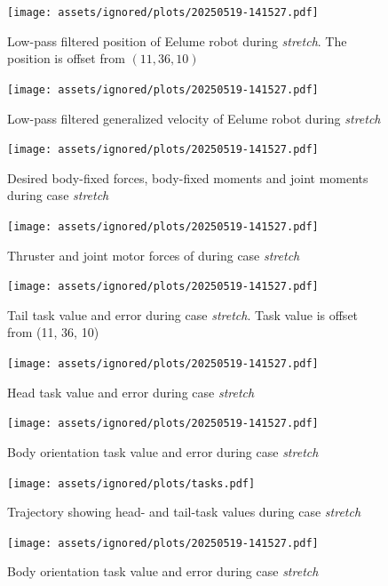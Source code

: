 \begin{figure}[!ht]
    \centering
    \texttt{[image: assets/ignored/plots/20250519-141527.pdf]}
    \caption[Low-pass filtered position of Eelume robot during \textit{stretch} case with \gls{tpc}]
    {Low-pass filtered position of Eelume robot during \textit{stretch}. The position is offset from \((11, 36, 10)\)}
    \label{fig:results:tpc:stretch:1:pos}
\end{figure}
\begin{figure}[!ht]
    \centering
    \texttt{[image: assets/ignored/plots/20250519-141527.pdf]}
    \caption{Low-pass filtered generalized velocity of Eelume robot during \textit{stretch}}
    \label{fig:results:tpc:stretch:1:vel}
\end{figure}
\begin{figure}[!ht]
    \centering
    \texttt{[image: assets/ignored/plots/20250519-141527.pdf]}
    \caption{Desired body-fixed forces, body-fixed moments and joint moments during case \textit{stretch}}
    \label{fig:results:tpc:stretch:1:forces}
\end{figure}
\begin{figure}[!ht]
    \centering
    \texttt{[image: assets/ignored/plots/20250519-141527.pdf]}
    \caption{Thruster and joint motor forces of during case \textit{stretch}}
    \label{fig:results:tpc:stretch:1:forces-torques}
\end{figure}
\begin{figure}[!ht]
    \centering
    \texttt{[image: assets/ignored/plots/20250519-141527.pdf]}
    \caption[Tail task value and error during case \textit{stretch}]{Tail task value and error during case \textit{stretch}. Task value is offset from (11, 36, 10)}
    \label{fig:results:tpc:stretch:1:task:1}
\end{figure}
\begin{figure}[!ht]
    \centering
    \texttt{[image: assets/ignored/plots/20250519-141527.pdf]}
    \caption{Head task value and error during case \textit{stretch}}
    \label{fig:results:tpc:stretch:1:task:2}
\end{figure}
\begin{figure}[!ht]
    \centering
    \texttt{[image: assets/ignored/plots/20250519-141527.pdf]}
    \caption{Body orientation task value and error during case \textit{stretch}}
    \label{fig:results:tpc:stretch:1:task:3}
\end{figure}
\begin{figure}[!ht]
    \centering
    \texttt{[image: assets/ignored/plots/tasks.pdf]}
    \caption{Trajectory showing head- and tail-task values during case \textit{stretch}}
    \label{fig:results:tpc:stretch:task-traj}
\end{figure}
\begin{figure}[!ht]
    \centering
    \texttt{[image: assets/ignored/plots/20250519-141527.pdf]}
    \caption{Body orientation task value and error during case \textit{stretch}}
    \label{fig:results:tpc:stretch:dp-tracking}
\end{figure}

